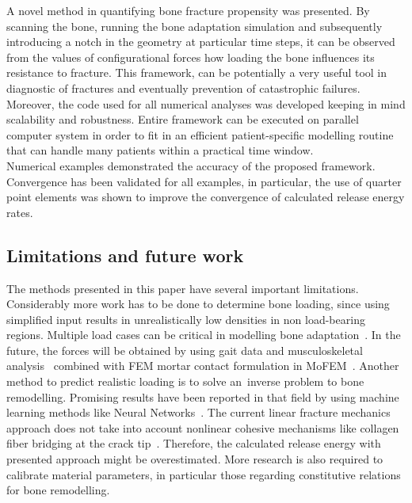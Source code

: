\documentclass[11pt]{acmeArticle}
\numberwithin{equation}{section}
\begin{document}
A novel method in quantifying bone fracture propensity was presented. By scanning the bone, running the bone adaptation simulation and subsequently introducing a notch in the geometry at particular time steps, it can be observed from the values of configurational forces how loading the bone influences its resistance to fracture. 
This framework, can be potentially a very useful tool in diagnostic of fractures and eventually prevention of catastrophic failures. 
Moreover, the code used for all numerical analyses was developed keeping in mind scalability and robustness. 
Entire framework can be executed on parallel computer system in order to fit in an efficient patient-specific modelling routine that can handle many patients within a practical time window. \\

Numerical examples demonstrated the accuracy of the proposed framework. 
Convergence has been validated for all examples, in particular, the use of quarter point elements was shown to improve the convergence of calculated release energy rates. 
\subsection{Limitations and future work}
The methods presented in this paper have several important limitations. 
Considerably more work has to be done to determine bone loading, since using simplified input results in unrealistically low densities in non load-bearing regions. 
Multiple load cases can be critical in modelling bone adaptation~\citep{geraldes2016consideration}. 
In the future, the forces will be obtained by using gait data and musculoskeletal analysis~\citep{Delp2007} combined with FEM mortar contact formulation in MoFEM~\citep{athanasiadis2018mortar}. 
Another method to predict realistic loading is to solve an~inverse problem to bone remodelling. 
Promising results have been reported in that field by using machine learning methods like Neural Networks~\citep{campoli2012computational}. 
The current linear fracture mechanics approach does not take into account nonlinear cohesive mechanisms like collagen fiber bridging at the crack tip~\citep{yang2006fracture}. 
Therefore, the calculated release energy with presented approach might be overestimated. 
More research is also required to calibrate material parameters, in particular those regarding constitutive relations for bone remodelling. 


\end{document}
